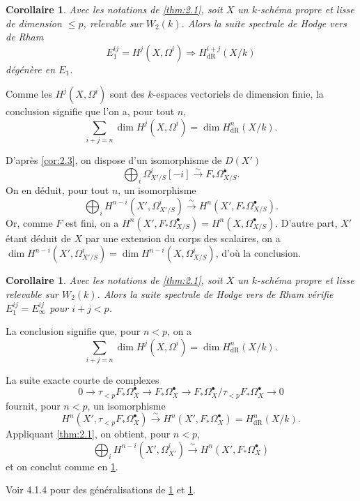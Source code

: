 \documentclass[12pt,a4paper]{article}
\theoremstyle{plain}
\newtheorem{corollary}[theorem]{Corollaire}
\theoremstyle{definition}
\theoremstyle{remark}
\newcommand{\dR}{\text{dR}}
\begin{document}
\begin{corollary}\label{cor:2.4}
Avec les notations de \ref{thm:2.1}, soit $X$ un $k$-sch\'ema propre et lisse de dimension $\le p$, relevable sur $W_2(k)$. Alors la suite spectrale de Hodge vers de Rham
\begin{equation}\label{eq:2.4.1}
E_1^{ij} = H^j(X, \Omega^i) \Rightarrow H^{i+j}_{\dR}(X/k)
\end{equation}
d\'eg\'en\`ere en $E_1$.
\end{corollary}

Comme les $H^j(X, \Omega^i)$ sont des $k$-espaces vectoriels de dimension finie, la conclusion signifie que l'on a, pour tout $n$,
\[
\sum_{i+j=n} \dim H^j(X, \Omega^i) = \dim H^n_{\dR}(X/k).
\]

D'apr\`es \ref{cor:2.3}, on dispose d'un isomorphisme de $D(X')$
\[
\bigoplus_i \Omega^i_{X'/S}[-i] \xrightarrow{\sim} F_* \Omega^{\bullet}_{X/S}.
\]
On en d\'eduit, pour tout $n$, un isomorphisme
\[
\bigoplus_i H^{n-i}(X', \Omega^i_{X'/S}) \xrightarrow{\sim} H^n(X', F_* \Omega^{\bullet}_{X/S}).
\]
Or, comme $F$ est fini, on a $H^n(X', F_* \Omega^{\bullet}_{X/S}) = H^n(X, \Omega^{\bullet}_{X/S})$. D'autre part, $X'$ \'etant d\'eduit de $X$ par une extension du corps des scalaires, on a $\dim H^{n-i}(X', \Omega^i_{X'/S}) = \dim H^{n-i}(X, \Omega^i_{X/S})$, d'o\`u la conclusion.

\begin{corollary}\label{cor:2.5}
Avec les notations de \ref{thm:2.1}, soit $X$ un $k$-sch\'ema propre et lisse relevable sur $W_2(k)$. Alors la suite spectrale de Hodge vers de Rham v\'erifie $E_1^{ij} = E_\infty^{ij}$ pour $i + j < p$.
\end{corollary}

La conclusion signifie que, pour $n < p$, on a
\[
\sum_{i+j=n} \dim H^j(X, \Omega^i) = \dim H^n_{\dR}(X/k).
\]

La suite exacte courte de complexes
\[
0 \to \tau_{<p} F_* \Omega^{\bullet}_X \to F_* \Omega^{\bullet}_X \to F_* \Omega^{\bullet}_X / \tau_{<p} F_* \Omega^{\bullet}_X \to 0
\]
fournit, pour $n < p$, un isomorphisme
\[
H^n(X', \tau_{<p} F_* \Omega^{\bullet}_X) \xrightarrow{\sim} H^n(X', F_* \Omega^{\bullet}_X) = H^n_{\dR}(X/k).
\]
Appliquant \ref{thm:2.1}, on obtient, pour $n < p$,
\[
\bigoplus_i H^{n-i}(X', \Omega^i_{X'}) \xrightarrow{\sim} H^n(X', F_* \Omega^{\bullet}_X)
\]
et on conclut comme en \ref{cor:2.4}.

Voir 4.1.4 pour des g\'en\'eralisations de \ref{cor:2.4} et \ref{cor:2.5}.
\end{document}
